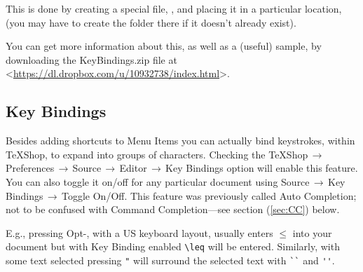 \documentclass[letterpaper,11pt]{article}
\newcommand{\TS}{\textsf{\TeX Shop}}
\newcommand{\cmd}[1]{\textsf{#1}}
\newcommand{\mnu}[1]{\textsf{#1}}
\newcommand{\To}{\,\(\to\)\,}
\begin{document}
This is done by creating a special file, , and placing it in a particular location,  (you may have to create the  folder there if it doesn't already exist).

You can get more information about this, as well as a (useful) sample, by downloading the \textsf{KeyBindings.zip} file at <\url{https://dl.dropbox.com/u/10932738/index.html}>.


\subsection{Key Bindings}

Besides adding shortcuts to Menu Items you can actually bind keystrokes, within \TS, to expand into groups of characters. Checking the \mnu{TeXShop}\To\mnu{Preferences}\To\mnu{Source}\To\mnu{Editor}\To\mnu{Key Bindings} option will enable this feature. You can also toggle it on/off for any particular document using \mnu{Source}\To\mnu{Key Bindings}\To\mnu{Toggle On/Off}. This feature was previously called Auto Completion; not to be confused with Command Completion---see section (\ref{sec:CC}) below.

E.g., pressing \cmd{Opt-,} with a US keyboard layout, usually enters \texttt{\(\leq\)} into your document but with Key Binding enabled \verb|\leq| will be entered. Similarly, with some text selected pressing \verb|"| will surround the selected text with \verb|``| and \verb|''|.
\end{document}
